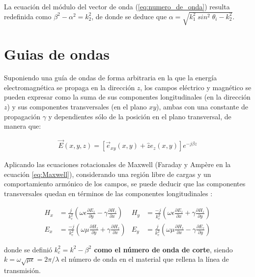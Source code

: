 La ecuación del módulo del vector de onda (\ref{eq:numero_de_onda}) resulta redefinida como $\beta^2 - \alpha^2 = k_2^2$, de donde se deduce que $\alpha = \sqrt{k_1^2\;sin^2\;\theta_i - k_2^2}$.



\section{Guias de ondas}
\label{subsec_guias_de_ondas}

Suponiendo una guía de ondas de forma arbitraria en la que la energía electromagnética se propaga en la dirección $z$, los campos eléctrico y magnético se pueden expresar como la suma de sus componentes longitudinales (en la dirección $z$) y sus componentes transversales (en el plano $xy$), ambas con una constante de propagación $\gamma$ y dependientes sólo de la posición en el plano transversal, de manera que:

\begin{align}
	\vec{E}(x,y,z) = \left[ \vec{e}_{xy}(x,y) + \hat{z} e_z(x,y) \right] e^{-j\beta z}
\end{align}

Aplicando las ecuaciones rotacionales de Maxwell (Faraday y Ampère en la ecuación \ref{eq:Maxwell}), considerando una región libre de cargas y un comportamiento armónico de los campos, se puede deducir que las componentes transversales quedan en términos de las componentes longitudinales \cite{Fernandez:Electromag}:

\begin{equation}
	\begin{aligned}
		H_x &= \frac{j}{k_c^2} \left(\omega \epsilon \frac{\partial E_z}{\partial y} - \gamma \frac{\partial H_z}{\partial x} \right) & H_y &= \frac{-j}{k_c^2} \left(\omega \epsilon \frac{\partial E_z}{\partial x} + \gamma \frac{\partial H_z}{\partial y} \right)\\
		E_x &= \frac{-j}{k_c^2} \left(\omega \mu \frac{\partial H_z}{\partial y} + \gamma \frac{\partial H_z}{\partial x} \right) & E_y &= \frac{j}{k_c^2} \left(\omega \mu \frac{\partial H_z}{\partial x} - \gamma \frac{\partial E_z}{\partial y} \right)
	\end{aligned}
	\label{eq:campos_guia_de_ondas}
\end{equation}

donde se definió \textbf{$k_c^2 = k^2 - \beta^2$ como el número de onda de corte}, siendo $k = \omega \sqrt{\mu \epsilon} = 2\pi/\lambda$ el número de onda  en el material que rellena la línea de transmisión.

